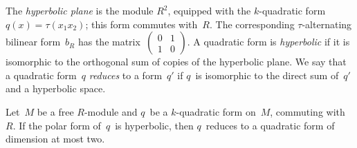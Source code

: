 \documentclass{article}%
\def\mat#1{\begin{pmatrix}#1\end{pmatrix}}
\begin{document}
The \emph{hyperbolic plane} is the module $R^2$, equipped with the
$k$-quadratic form~$q(x) = τ(x_1 x_2)$; this form commutes with~$R$. The
corresponding $τ$-alternating bilinear form~$b_R$ has the
matrix~$\mat{0&1\\1&0}$. A quadratic form is \emph{hyperbolic} if it is
isomorphic to the orthogonal sum of copies of the hyperbolic plane.
We say that a quadratic form~$q$ \emph{reduces} to a form~$q'$ if $q$~is
isomorphic to the direct sum of~$q'$ and a hyperbolic space.

\begin{prop}\label{prop:witt-four}%
Let~$M$ be a free $R$-module and $q$~be a $k$-quadratic form on~$M$,
commuting with~$R$.
If the polar form of~$q$~is hyperbolic, then $q$~reduces to a quadratic
form of dimension at most two.
\end{prop}
\end{document}
